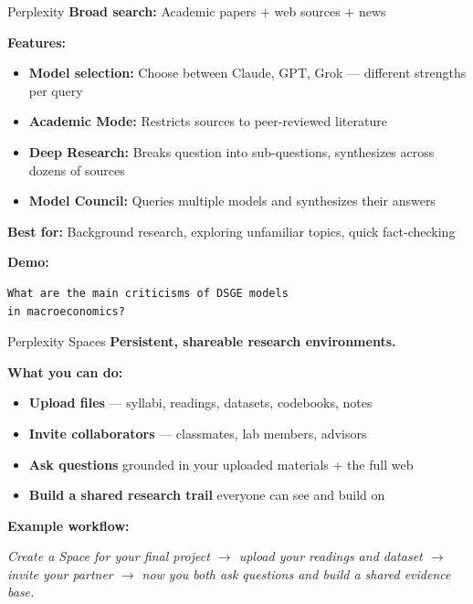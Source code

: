 \documentclass[aspectratio=169]{beamer}
\begin{document}
\begin{frame}[fragile]{Perplexity}
    \textbf{Broad search:} Academic papers + web sources + news

    \vspace{1em}
    \textbf{Features:}
    \begin{itemize}
        \item \textbf{Model selection:} Choose between Claude, GPT, Grok --- different strengths per query
        \item \textbf{Academic Mode:} Restricts sources to peer-reviewed literature
        \item \textbf{Deep Research:} Breaks question into sub-questions, synthesizes across dozens of sources
        \item \textbf{Model Council:} Queries multiple models and synthesizes their answers
    \end{itemize}

    \vspace{1em}
    \textbf{Best for:} Background research, exploring unfamiliar topics, quick fact-checking

    \vspace{1em}
    \textbf{Demo:}
    \begin{lstlisting}[basicstyle=\ttfamily\small]
What are the main criticisms of DSGE models
in macroeconomics?
    \end{lstlisting}
\end{frame}

\begin{frame}{Perplexity Spaces}
    \textbf{Persistent, shareable research environments.}

    \vspace{0.5em}
    \textbf{What you can do:}
    \begin{itemize}
        \item \textbf{Upload files} --- syllabi, readings, datasets, codebooks, notes
        \item \textbf{Invite collaborators} --- classmates, lab members, advisors
        \item \textbf{Ask questions} grounded in your uploaded materials + the full web
        \item \textbf{Build a shared research trail} everyone can see and build on
    \end{itemize}

    \vspace{0.5em}
    \textbf{Example workflow:}

    \vspace{0.3em}
    \textit{Create a Space for your final project $\rightarrow$ upload your readings and dataset $\rightarrow$ invite your partner $\rightarrow$ now you both ask questions and build a shared evidence base.}
\end{frame}
\end{document}
